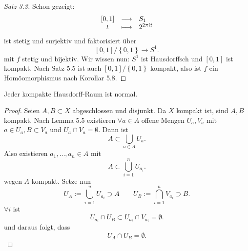 \begin{proof}[Satz 3.3]
    Schon gezeigt:
        \begin{equation*}
        \begin{array}{c c l} 
            [0,1] & \longrightarrow & S_1 \\
        t & \longmapsto &  2^{2\pi it}
        \end{array}
    \end{equation*}
    ist stetig und surjektiv und faktorisiert über
    \[
        [0,1] /\left \{0,1\right\}  \to  S^1
    .\] 
    mit $f$ stetig und bijektiv. Wir wissen nun:  $S^1$ ist Hausdorffsch und  $[0,1]$ ist kompakt. Nach Satz 5.5 ist auch  $[0,1] /\left \{0,1\right\} $ kompakt, also ist $f$ ein Homöomorphismus nach Korollar 5.8.
\end{proof}


\begin{theorem}
    Jeder kompakte Hausdorff-Raum ist normal.
    \label{thm:compact-hausdorff-space-is-normal}
\end{theorem}
\begin{proof}
    Seien $A,B\subset X$ abgeschlossen und disjunkt. Da $X$ kompakt ist, sind  $A,B$ kompakt. Nach Lemma 5.5 existieren  $\forall a\in A$ offene Mengen $U_a, V_a$ mit $a\in U_a, B\subset V_a$ und $U_a \cap V_a = \emptyset$. Dann ist
    \[
    A \subset \bigcup_{a\in A} U_a
    .\] 
    Also existieren $a_1,\ldots,a_n\in A$ mit
    \[
    A\subset \bigcup_{i=1}^n U_{a_i}
    .\] 
    wegen $A$ kompakt. Setze nun
    \[
    U_A := \bigcup_{i=1}^n U_{a_i}\supset A \qquad U_B := \bigcap_{i=1}^n V_{a_i}\supset B
    .\] 
$\forall i$ ist 
\[
    U_{a_i} \cap U_B \subset U_{a_i} \cap V_{a_i} = \emptyset
.\] 
und daraus folgt, dass
\[
U_A \cap U_B = \emptyset
.\] 
\end{proof}

